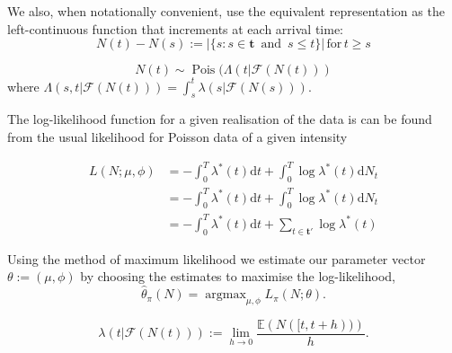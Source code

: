 \documentclass[11pt]{article}
\newcommand{\dd}{\mathrm{d}}
\newcommand{\bb}[1]{\mathbb{#1}}
\renewcommand{\v}[1]{\boldsymbol{#1}}
\newcommand{\cc}[1]{\mathcal{#1}}
\renewcommand{\cc}[1]{\mathcal{#1}}
\newcommand{\oo}[1]{\operatorname{#1}}
\begin{document}
    We also, when notationally convenient, use the equivalent representation
as the left-continuous function that increments at each arrival time: \[
N(t)-N(s):= \left|\{s:s\in \v{t}\,\text{ and }\,s\leq t\}\right| \,\mathrm{ for }\, t\geq s
\]

    \[N(t)\sim \operatorname{Pois}(\Lambda(t|\mathcal{F}(N(t)))\] where
\(\Lambda(s,t|\mathcal{F}(N(t)))=\int_s^t \lambda(s|\mathcal{F}(N(s))).\)

    The log-likelihood function for a given realisation of the data is can
be found from the usual likelihood for Poisson data of a given intensity
\cite{ozaki_estimating_1979}

\[\begin{aligned}L(N;\mu,\phi) &=-\int_0^T\lambda^*(t) \dd t + \int_0^T\log \lambda^*(t) \dd N_t \\
&=-\int_0^T\lambda^*(t)\dd t + \int_0^T\log \lambda^*(t) \dd N_t \\
&=-\int_0^T\lambda^*(t)\dd t + \sum_{t\in\v{t}'}\log \lambda^*(t)
\end{aligned}\]

Using the method of maximum likelihood we estimate our parameter vector
\(\theta:=(\mu, \phi)\) by choosing the estimates to maximise the
log-likelihood,
\[\hat{\theta}_\pi(N) = \oo{argmax}_{\mu,\phi} L_\pi(N;\theta).\]

    \[\lambda(t|\cc{F}(N(t))):=\lim_{h\to 0} \frac{\bb E\left(N([t,t+h))\right)}{h}.\]


    
    




    
    
\end{document}
